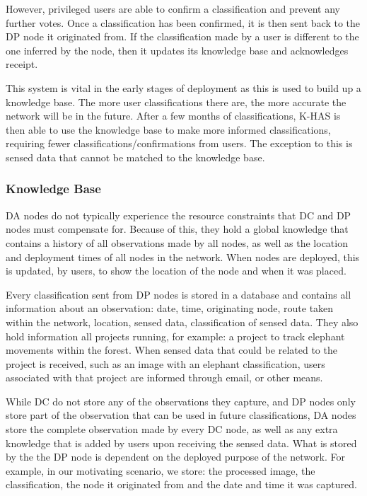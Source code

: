 	However, privileged users are able to confirm a classification and prevent any further votes. Once a classification has been confirmed, it is then sent back to the DP node it originated from. If the classification made by a user is different to the one inferred by the node, then it updates its knowledge base and acknowledges receipt.

	This system is vital in the early stages of deployment as this is used to build up a knowledge base. The more user classifications there are, the more accurate the network will be in the future. After a few months of classifications, K-HAS is then able to use the knowledge base to make more informed classifications, requiring fewer classifications/confirmations from users. The exception to this is sensed data that cannot be matched to the knowledge base.
	
	\subsubsection{Knowledge Base}
	DA nodes do not typically experience the resource constraints that DC and DP nodes must compensate for. Because of this, they hold a global knowledge that contains a history of all observations made by all nodes, as well as the location and deployment times of all nodes in the network. When nodes are deployed, this is updated, by users, to show the location of the node and when it was placed. 

	Every classification sent from DP nodes is stored in a database and contains all information about an observation: date, time, originating node, route taken within the network, location, sensed data, classification of sensed data. They also hold information all projects running, for example: a project to track elephant movements within the forest. When sensed data that could be related to the project is received, such as an image with an elephant classification, users associated with that project are informed through email, or other means.
	
	While DC do not store any of the observations they capture, and DP nodes only store part of the observation that can be used in future classifications, DA nodes store the complete observation made by every DC node, as well as any extra knowledge that is added by users upon receiving the sensed data. What is stored by the the DP node is dependent on the deployed purpose of the network. For example, in our motivating scenario, we store: the processed image, the classification, the node it originated from and the date and time it was captured.
	
